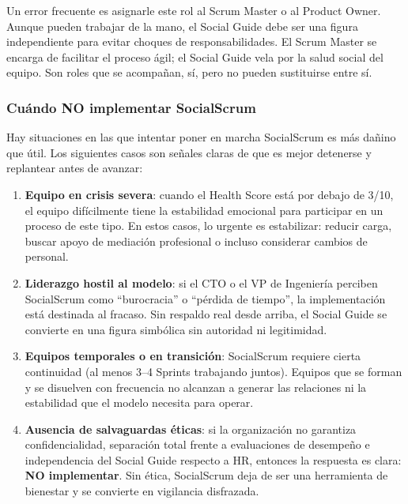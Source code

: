 Un error frecuente es asignarle este rol al Scrum Master o al Product Owner. Aunque pueden trabajar de la mano, el Social Guide debe ser una figura independiente para evitar choques de responsabilidades. El Scrum Master se encarga de facilitar el proceso ágil; el Social Guide vela por la salud social del equipo. Son roles que se acompañan, sí, pero no pueden sustituirse entre sí.

\subsubsection{Cuándo \textbf{NO} implementar SocialScrum}

Hay situaciones en las que intentar poner en marcha SocialScrum es más dañino que útil. Los siguientes casos son señales claras de que es mejor detenerse y replantear antes de avanzar:

\begin{enumerate}
    \item \textbf{Equipo en crisis severa}: cuando el Health Score está por debajo de 3/10, el equipo difícilmente tiene la estabilidad emocional para participar en un proceso de este tipo. En estos casos, lo urgente es estabilizar: reducir carga, buscar apoyo de mediación profesional o incluso considerar cambios de personal.

    \item \textbf{Liderazgo hostil al modelo}: si el CTO o el VP de Ingeniería perciben SocialScrum como ``burocracia'' o ``pérdida de tiempo'', la implementación está destinada al fracaso. Sin respaldo real desde arriba, el Social Guide se convierte en una figura simbólica sin autoridad ni legitimidad.

    \item \textbf{Equipos temporales o en transición}: SocialScrum requiere cierta continuidad (al menos 3–4 Sprints trabajando juntos). Equipos que se forman y se disuelven con frecuencia no alcanzan a generar las relaciones ni la estabilidad que el modelo necesita para operar.

    \item \textbf{Ausencia de salvaguardas éticas}: si la organización no garantiza confidencialidad, separación total frente a evaluaciones de desempeño e independencia del Social Guide respecto a HR, entonces la respuesta es clara: \textbf{NO implementar}. Sin ética, SocialScrum deja de ser una herramienta de bienestar y se convierte en vigilancia disfrazada.

\end{enumerate}

